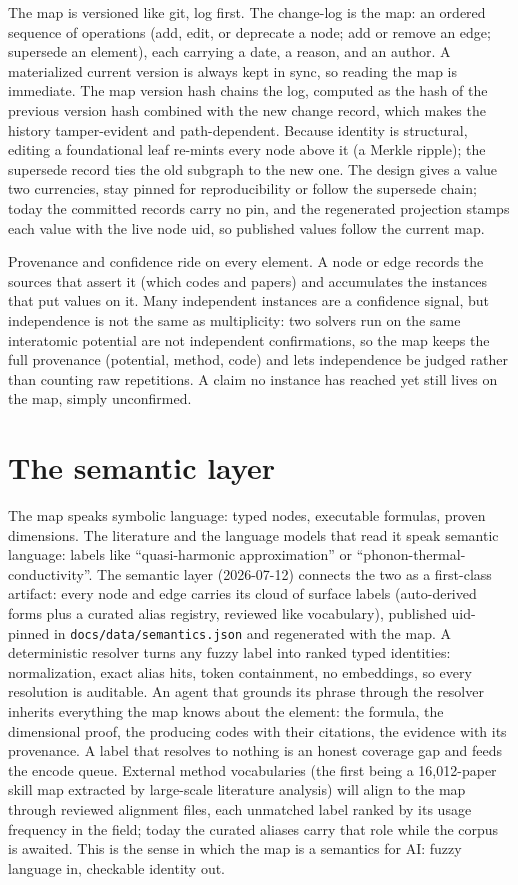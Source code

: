 \documentclass[11pt,a4paper]{article}
\begin{document}
The map is versioned like git, log first. The change-log is the map: an ordered
sequence of operations (add, edit, or deprecate a node; add or remove an edge;
supersede an element), each carrying a date, a reason, and an author. A
materialized current version is always kept in sync, so reading the map is
immediate. The map version hash chains the log, computed as the hash of the
previous version hash combined with the new change record, which makes the
history tamper-evident and path-dependent. Because identity is structural,
editing a foundational leaf re-mints every node above it (a Merkle ripple); the
supersede record ties the old subgraph to the new one. The design gives a
value two currencies, stay pinned for reproducibility or follow the supersede
chain; today the committed records carry no pin, and the regenerated
projection stamps each value with the live node uid, so published values
follow the current map.

Provenance and confidence ride on every element. A node or edge records the
sources that assert it (which codes and papers) and accumulates the instances
that put values on it. Many independent instances are a confidence signal, but
independence is not the same as multiplicity: two solvers run on the same
interatomic potential are not independent confirmations, so the map keeps the
full provenance (potential, method, code) and lets independence be judged rather
than counting raw repetitions. A claim no instance has reached yet still lives
on the map, simply unconfirmed.

\section{The semantic layer}

The map speaks symbolic language: typed nodes, executable formulas, proven
dimensions. The literature and the language models that read it speak semantic
language: labels like ``quasi-harmonic approximation'' or
``phonon-thermal-conductivity''. The semantic layer (2026-07-12) connects the
two as a first-class artifact: every node and edge carries its cloud of surface
labels (auto-derived forms plus a curated alias registry, reviewed like
vocabulary), published uid-pinned in \texttt{docs/data/semantics.json} and
regenerated with the map. A deterministic resolver turns any fuzzy label into
ranked typed identities: normalization, exact alias hits, token containment,
no embeddings, so every resolution is auditable. An agent that grounds its
phrase through the resolver inherits everything the map knows about the
element: the formula, the dimensional proof, the producing codes with their
citations, the evidence with its provenance. A label that resolves to nothing
is an honest coverage gap and feeds the encode queue. External method
vocabularies (the first being a 16,012-paper skill map extracted by
large-scale literature analysis) will align to the map through reviewed
alignment files, each unmatched label ranked by its usage frequency in the
field; today the curated aliases carry that role while the corpus is awaited. This
is the sense in which the map is a semantics for AI: fuzzy language in,
checkable identity out.
\end{document}
